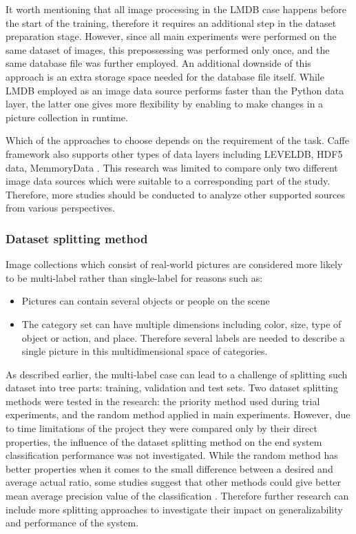 It worth mentioning that all image processing in the LMDB case happens before the start of the training, therefore it requires an additional step in the dataset preparation stage. However, since all main experiments were performed on the same dataset of images, this prepossessing was performed only once, and the same database file was further employed. An additional downside of this approach is an extra storage space needed for the database file itself. While LMDB employed as an image data source performs faster than the Python data layer, the latter one gives more flexibility by enabling to make changes in a picture collection in runtime.

Which of the approaches to choose depends on the requirement of the task. Caffe framework also supports other types of data layers including LEVELDB, HDF5 data, MemmoryData \cite{CaffeLayerCatalogue}. This research was limited to compare only two different image data sources which were suitable to a corresponding part of the study. Therefore, more studies should be conducted to analyze other supported sources from various perspectives.

\subsubsection{Dataset splitting method}
Image collections which consist of real-world pictures are considered more likely to be multi-label rather than single-label for reasons such as:
\begin{itemize}
    \item Pictures can contain several objects or people on the scene
    \item The category set can have multiple dimensions including color, size, type of object or action, and place. Therefore several labels are needed to describe a single picture in this multidimensional space of categories.
\end{itemize}

As described earlier, the multi-label case can lead to a challenge of splitting such dataset into tree parts: training, validation and test sets. Two dataset splitting methods were tested in the research: the priority method used during trial experiments, and the random method applied in main experiments. However, due to time limitations of the project they were compared only by their direct properties, the influence of the dataset splitting method on the end system classification performance was not investigated. While the random method has better properties when it comes to the small difference between a desired and average actual ratio, some studies suggest that other methods could give better mean average precision value of the classification \cite{Sechidis2011OnData}. Therefore further research can include more splitting approaches to investigate their impact on generalizability and performance of the system.

